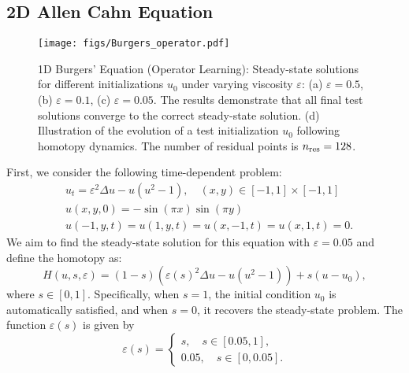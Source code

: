 

\subsection{2D Allen Cahn Equation}
\begin{figure*}[t]
    \centering
    \texttt{[image: figs/Burgers\_operator.pdf]}
    \caption{1D Burgers' Equation (Operator Learning): Steady-state solutions for different initializations $u_0$ under varying viscosity $\varepsilon$: (a) $\varepsilon = 0.5$, (b) $\varepsilon = 0.1$, (c) $\varepsilon = 0.05$. The results demonstrate that all final test solutions converge to the correct steady-state solution. (d) Illustration of the evolution of a test initialization $u_0$ following homotopy dynamics. The number of residual points is $n_\textup{res} = 128$.}
    \label{fig:Burgers_result}
\end{figure*}
First, we consider the following time-dependent problem:
\begin{align}
& u_t = \varepsilon^2 \Delta u - u(u^2 - 1), \quad (x, y) \in [-1, 1] \times [-1, 1] \nonumber \\
& u(x, y, 0) = - \sin(\pi x) \sin(\pi y) \label{eq.hom_2D_AC}\\
& u(-1, y, t) = u(1, y, t) = u(x, -1, t) = u(x, 1, t) = 0. \nonumber
\end{align}
We aim to find the steady-state solution for this equation with $\varepsilon = 0.05$ and define the homotopy as:
\begin{equation}
    H(u, s, \varepsilon) = (1 - s)\left(\varepsilon(s)^2 \Delta u - u(u^2 - 1)\right) + s(u - u_0),\nonumber
\end{equation}
where $s \in [0, 1]$. Specifically, when $s = 1$, the initial condition $u_0$ is automatically satisfied, and when $s = 0$, it recovers the steady-state problem. The function $\varepsilon(s)$ is given by
\begin{equation}
\varepsilon(s) = 
\left\{\begin{array}{l}
s, \quad s \in [0.05, 1], \\
0.05, \quad s \in [0, 0.05].
\end{array}\right.\label{eq:epsilon_t}
\end{equation}

